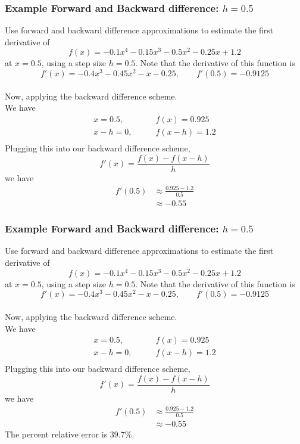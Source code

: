 \documentclass{if-beamer}
\begin{document}
\begin{frame}
	\frametitle{Example Forward and Backward difference: $h= 0.5$}
	Use forward and backward difference approximations to estimate the first derivative of
	$$f(x) = -0.1x^4-0.15x^3-0.5x^2-0.25x+1.2 $$
	at $x=0.5$, using a step size $h = 0.5$. Note that the derivative of this function is
	$$f'(x) = -0.4x^3-0.45x^2-x-0.25, \qquad f'(0.5) = -0.9125$$
	\\\vspace{5pt}
	Now, applying the backward difference scheme.\\\vspace{5pt}
	We have
	\begin{align*}
		x = 0.5, \qquad &f(x) = 0.925\\
		x-h = 0, \qquad &f(x-h) = 1.2\\
	\end{align*}
	Plugging this into our backward difference scheme, 
	$$f'(x) = \frac{f(x)-f(x-h)}{h} $$
	we have
	\begin{align*}
		f'(0.5) &\approx \frac{0.925-1.2}{0.5} \\
		&\approx -0.55
	\end{align*}
\end{frame}


\begin{frame}
	\frametitle{Example Forward and Backward difference: $h= 0.5$}
	Use forward and backward difference approximations to estimate the first derivative of
	$$f(x) = -0.1x^4-0.15x^3-0.5x^2-0.25x+1.2 $$
	at $x=0.5$, using a step size $h = 0.5$. Note that the derivative of this function is
	$$f'(x) = -0.4x^3-0.45x^2-x-0.25, \qquad f'(0.5) = -0.9125$$
	\\\vspace{5pt}
	Now, applying the backward difference scheme.\\\vspace{5pt}
	We have
	\begin{align*}
		x = 0.5, \qquad &f(x) = 0.925\\
		x-h = 0, \qquad &f(x-h) = 1.2\\
	\end{align*}
	Plugging this into our backward difference scheme, 
	$$f'(x) = \frac{f(x)-f(x-h)}{h} $$
	we have
	\begin{align*}
		f'(0.5) &\approx \frac{0.925-1.2}{0.5} \\
		&\approx -0.55
	\end{align*}
	The percent relative error is $39.7\%$.
\end{frame}
\end{document}
